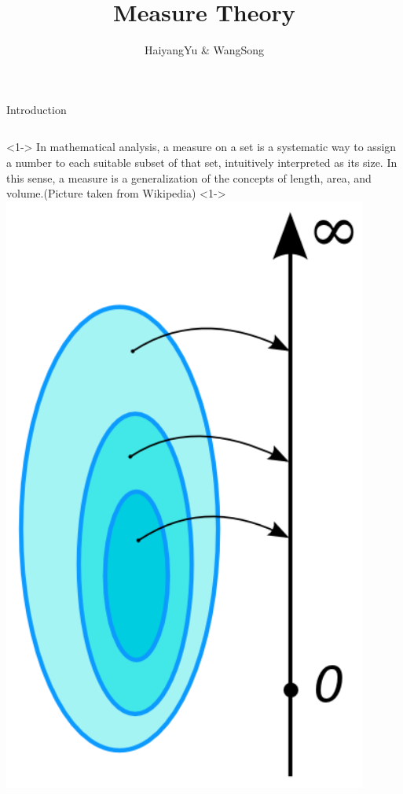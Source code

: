 \documentclass[10pt]{beamer}
\begin{document}
\title{Measure Theory}
\author{HaiyangYu \&  WangSong}
\frame{\titlepage}

\begin{frame}{Introduction}
\begin{columns}
<1->
In mathematical analysis, a measure on a set is a systematic way to assign a number to each suitable subset of that set, intuitively interpreted as its size. In this sense, a measure is a generalization of the concepts of length, area, and volume.(Picture taken from Wikipedia)
<1->
\includegraphics[width=0.9\textwidth,totalheight=0.60\textheight]{1.png}
\end{columns}
\end{frame}
\end{document}

